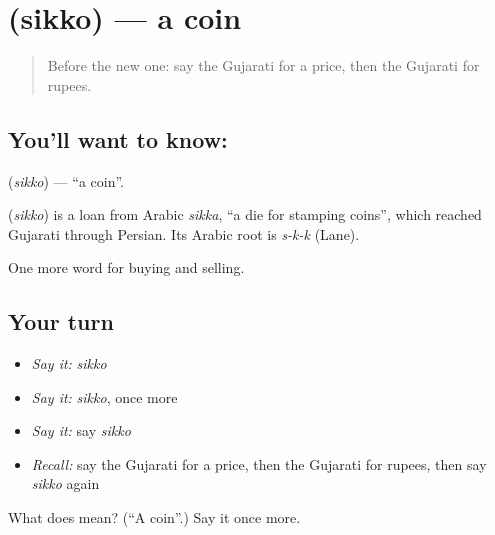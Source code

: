 \section[\texorpdfstring{\gu{સિક્કો} (sikko)}{સિક્કો (sikko)}]{ (sikko) — a coin}

\label{lesson:GU-C57-coin}



\begin{quote}
Before the new one: say the Gujarati for a price, then the Gujarati for rupees.
\end{quote}

\subsection*{You'll want to know: }
\textbf{} (\emph{sikko}) — \textquotedblleft{}a coin\textquotedblright{}.

\begin{cousinweb}
\textbf{} (\emph{sikko}) is a loan from Arabic \emph{sikka}, \textquotedblleft{}a die for stamping coins\textquotedblright{}, which reached Gujarati through Persian. Its Arabic root is \emph{s-k-k} (Lane).
\end{cousinweb}

\begin{grammarlens}[title={What you've built}]
One more word for buying and selling.
\end{grammarlens}

\subsection*{Your turn}
\begin{itemize}
\raggedright
  \item \emph{Say it:} \emph{sikko}
  \item \emph{Say it:} \emph{sikko}, once more
  \item \emph{Say it:} say \emph{sikko}
  \item \emph{Recall:} say the Gujarati for a price, then the Gujarati for rupees, then say \emph{sikko} again
\end{itemize}

\begin{tcolorbox}[breakable,colback=teal!4,colframe=teal!35!black,title={Before you move on}]
What does  mean? (\textquotedblleft{}A coin\textquotedblright{}.) Say it once more.
\end{tcolorbox}

